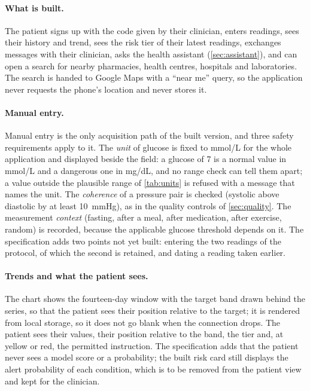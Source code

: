 \paragraph{What is built.} The patient signs up with the code given by their clinician, enters readings, sees their history and trend, sees the risk tier of their latest readings, exchanges messages with their clinician, asks the health assistant (\cref{sec:assistant}), and can open a search for nearby pharmacies, health centres, hospitals and laboratories. The search is handed to Google Maps with a ``near me'' query, so the application never requests the phone's location and never stores it.

\paragraph{Manual entry.} Manual entry is the only acquisition path of the built version, and three safety requirements apply to it. The \emph{unit} of glucose is fixed to mmol/L for the whole application and displayed beside the field: a glucose of 7 is a normal value in mmol/L and a dangerous one in mg/dL, and no range check can tell them apart; a value outside the plausible range of \cref{tab:units} is refused with a message that names the unit. The \emph{coherence} of a pressure pair is checked (systolic above diastolic by at least 10~mmHg), as in the quality controls of \cref{sec:quality}. The measurement \emph{context} (fasting, after a meal, after medication, after exercise, random) is recorded, because the applicable glucose threshold depends on it. The specification adds two points not yet built: entering the two readings of the protocol, of which the second is retained, and dating a reading taken earlier.

\paragraph{Trends and what the patient sees.} The chart shows the fourteen-day window with the target band drawn behind the series, so that the patient sees their position relative to the target; it is rendered from local storage, so it does not go blank when the connection drops. The patient sees their values, their position relative to the band, the tier and, at yellow or red, the permitted instruction. The specification adds that the patient never sees a model score or a probability; the built risk card still displays the alert probability of each condition, which is to be removed from the patient view and kept for the clinician.

